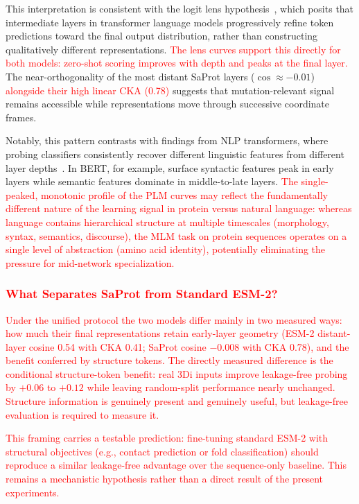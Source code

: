 \documentclass[numbered,webpdf,modern,large]{oup-authoring-template}
\newcommand{\rev}[1]{\textcolor{red}{#1}}
\begin{document}
This interpretation is consistent with the logit lens
hypothesis~\cite{nostalgebraist2020,belrose2023eliciting},
which posits that intermediate layers in transformer language models progressively
refine token predictions toward the final output distribution, rather than
constructing qualitatively different representations. \rev{The lens curves
support this directly for both models: zero-shot scoring improves with depth
and peaks at the final layer.} The near-orthogonality of the most distant SaProt
layers ($\cos \approx -0.01$) \rev{alongside their high linear CKA (0.78)}
suggests that mutation-relevant signal
remains accessible while
representations move through successive coordinate frames.

Notably, this pattern contrasts with findings from NLP transformers, where
probing classifiers consistently recover different linguistic features from
different layer depths~\cite{tenney2019bert,rogers2021bertology}. In BERT, for example,
surface syntactic features peak in early layers while semantic features dominate in
middle-to-late layers. \rev{The single-peaked, monotonic profile of the PLM
curves may
reflect the fundamentally different nature of the learning signal in protein
versus natural language: whereas language contains hierarchical structure at
multiple timescales (morphology, syntax, semantics, discourse), the MLM task on
protein sequences operates on a single level of abstraction (amino acid identity),
potentially eliminating the pressure for mid-network specialization.}

\subsubsection{\rev{What Separates SaProt from Standard ESM-2?}}

\rev{Under the unified protocol the two models differ mainly in two measured
ways: how much their final representations retain early-layer geometry (ESM-2
distant-layer cosine 0.54 with CKA 0.41; SaProt cosine $-0.008$ with CKA
0.78), and the benefit conferred by structure tokens. The directly measured
difference is the conditional structure-token benefit: real 3Di inputs improve
leakage-free probing by $+0.06$ to $+0.12$ while leaving random-split performance
nearly unchanged. Structure information is genuinely present and genuinely
useful, but leakage-free evaluation is required to measure it.}

\rev{This framing carries a testable prediction: fine-tuning standard ESM-2
with structural objectives (e.g., contact prediction or fold classification)
should reproduce a similar leakage-free advantage over the sequence-only baseline.
This remains a mechanistic hypothesis rather than a direct result of the present
experiments.}
\end{document}
